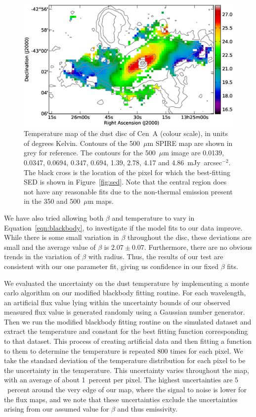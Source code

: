 \begin{figure}
\includegraphics[width=\columnwidth]{ch2/Fig4_CenA_temp_map}
\caption[Temperature map of the dust disc of Centaurus~A]{Temperature map of the dust disc of Cen~A (colour scale), in units of degrees Kelvin.  Contours of the 500~$\mu$m SPIRE map are shown in grey for reference.  The contours for the 500~$\mu$m image are 0.0139, 0.0347, 0.0694, 0.347, 0.694, 1.39, 2.78, 4.17 and 4.86~mJy~arcsec$^{-2}$.  The black cross is the location of the pixel for which the best-fitting SED is shown in Figure~\ref{fig:sed}. Note that the central region does not have any reasonable fits due to the non-thermal emission present in the 350 and 500~$\mu$m maps.}
\label{fig:temp}
\end{figure}

We have also tried allowing both $\beta$ and temperature to vary in Equation~\ref{eqn:blackbody}, to investigate if the model fits to our data improve.  While there is some small variation in $\beta$ throughout the disc, these deviations are small and the average value of $\beta$ is $2.07 \pm 0.07$.  Furthermore, there are no obvious trends in the variation of $\beta$ with radius.  Thus, the results of our test are consistent with our one parameter fit, giving us confidence in our fixed $\beta$ fits.

We evaluated the uncertainty on the dust temperature by implementing a monte carlo algorithm on our modified blackbody fitting routine.  For each wavelength, an artificial flux value lying within the uncertainty bounds of our observed measured flux value is generated randomly using a Gaussian number generator.  Then we run the modified blackbody fitting routine on the simulated dataset and extract the temperature and constant for the best fitting function corresponding to that dataset.  This process of creating artificial data and then fitting a function to them to determine the temperature is repeated 800 times for each pixel.  We take the standard deviation of the temperature distribution for each pixel to be the uncertainty in the temperature.  This uncertainty varies throughout the map, with an average of about 1~percent per pixel.  The highest uncertainties are $5$~percent around the very edge of our map, where the signal to noise is lower for the flux maps, and we note that these uncertainties exclude the uncertainties arising from our assumed value for $\beta$ and thus emissivity.

